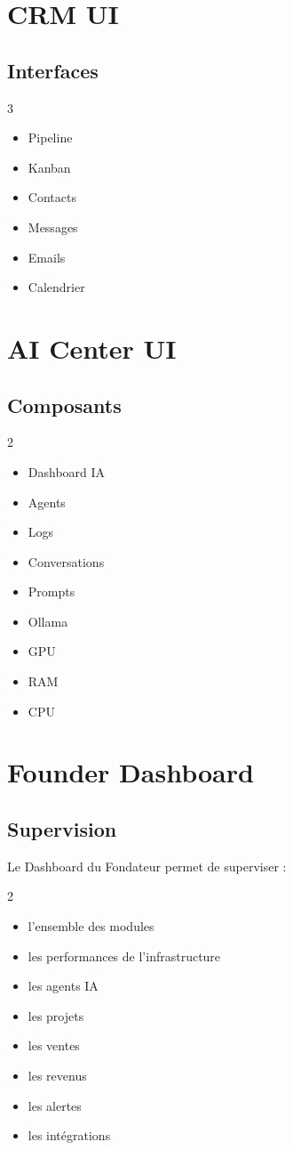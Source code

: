 \documentclass[12pt,a4paper,oneside]{book}
\begin{document}
\chapter{CRM UI}

\section{Interfaces}
\begin{multicols}{3}
\begin{itemize}
\item Pipeline
\item Kanban
\item Contacts
\item Messages
\item Emails
\item Calendrier
\end{itemize}
\end{multicols}

\chapter{AI Center UI}

\section{Composants}
\begin{multicols}{2}
\begin{itemize}
\item Dashboard IA
\item Agents
\item Logs
\item Conversations
\item Prompts
\item Ollama
\item GPU
\item RAM
\item CPU
\end{itemize}
\end{multicols}

\chapter{Founder Dashboard}

\section{Supervision}
Le Dashboard du Fondateur permet de superviser :
\begin{multicols}{2}
\begin{itemize}
\item l'ensemble des modules
\item les performances de l'infrastructure
\item les agents IA
\item les projets
\item les ventes
\item les revenus
\item les alertes
\item les intégrations
\end{itemize}
\end{multicols}
\end{document}
